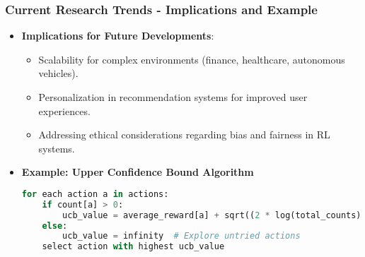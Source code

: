 \documentclass[aspectratio=169]{beamer}
\begin{document}
\begin{frame}[fragile]
    \frametitle{Current Research Trends - Implications and Example}
    \begin{itemize}
        \item \textbf{Implications for Future Developments}:
        \begin{itemize}
            \item Scalability for complex environments (finance, healthcare, autonomous vehicles).
            \item Personalization in recommendation systems for improved user experiences.
            \item Addressing ethical considerations regarding bias and fairness in RL systems.
        \end{itemize}
        \item \textbf{Example: Upper Confidence Bound Algorithm}
        \begin{lstlisting}[language=Python]
for each action a in actions:
    if count[a] > 0:
        ucb_value = average_reward[a] + sqrt((2 * log(total_counts)) / count[a])
    else:
        ucb_value = infinity  # Explore untried actions
    select action with highest ucb_value
        \end{lstlisting}
    \end{itemize}
\end{frame}
\end{document}
